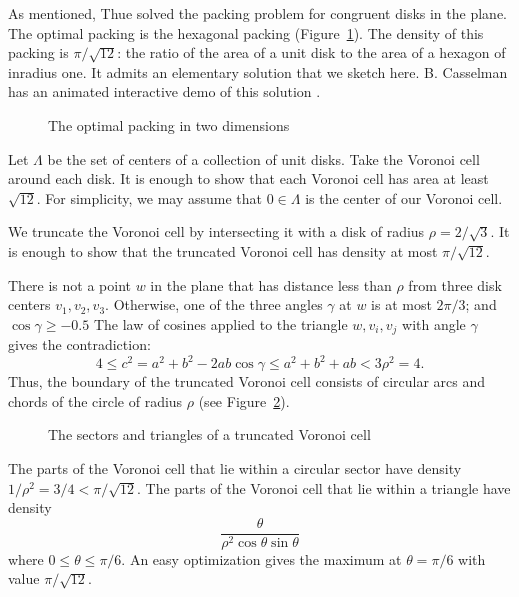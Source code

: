 As mentioned, 
Thue solved the  packing problem for congruent disks in the plane.
The optimal packing is the hexagonal packing (Figure~\ref{fig:2D-hex}). 
The density of this packing is $\pi/\sqrt{12}$: the ratio of the
area of a unit disk to the area of a hexagon of inradius one.
It admits an elementary solution that we sketch here.  B. Casselman
has an animated interactive demo of this solution \cite{BC00}.

\begin{figure}[htb]
  \centering
  \caption{The optimal packing in two dimensions}
  \label{fig:2D-hex}
\end{figure}

Let $\Lambda$ be the set of centers of a collection of unit disks.
Take the Voronoi cell around each disk.  It is enough to show that
each Voronoi cell has area at least $\sqrt{12}$.  For simplicity,
we may assume that $0\in\Lambda$ is the center of our Voronoi cell.  

We truncate the Voronoi cell by intersecting it with a disk of radius
$\rho=2/\sqrt3$.  It is enough to show that the truncated Voronoi cell has
density  at most $\pi/\sqrt{12}$.  

There is not a point $w$ in the plane that has distance less than $\rho$
from three disk centers $v_1,v_2,v_3$.  Otherwise, one of the three
angles $\gamma$ at $w$ is at most $2\pi/3$; and $\cos\gamma\ge -0.5$  
The law of cosines applied
to the triangle $w,v_i,v_j$ with angle $\gamma$ gives the contradiction:
   $$
   4 \le c^2 = a^2 + b^2 - 2 a b \cos\gamma 
   \le a^2 + b^2 + a b < 3\rho^2 = 4.
   $$
Thus, the boundary of the truncated Voronoi cell consists of circular
arcs and chords of the circle of radius $\rho$ (see Figure~\ref{fig:2D-proof}).

\begin{figure}[htb]
  \centering
  \caption{The sectors and triangles of a truncated Voronoi cell}
  \label{fig:2D-proof}
\end{figure}

The
parts of the Voronoi cell that lie within a circular sector have density
$1/\rho^2 = 3/4 < \pi/\sqrt{12}$.  The
parts of the Voronoi cell that
lie within a triangle have density
   \begin{equation}\label{eqn:rog2d}
   \frac{\theta}{\rho^2 \cos\theta\sin\theta}
   \end{equation}
where $0 \le \theta\le \pi/6$.  An easy optimization gives the maximum
at $\theta=\pi/6$ with value $\pi/\sqrt{12}$.

